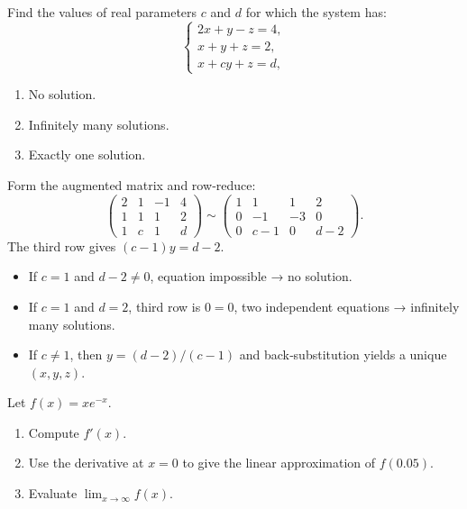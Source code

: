 \documentclass[11pt]{exam}
\begin{document}
\begin{questions}

\question[3]
Find the values of real parameters \(c\) and \(d\) for which the system has:
\[\begin{cases}
2x + y - z = 4,\\
x + y + z = 2,\\
x + cy + z = d,
\end{cases}\]
\begin{enumerate}[label=(\alph*)]
  \item No solution.
  \item Infinitely many solutions.
  \item Exactly one solution.
\end{enumerate}

\begin{solution}
Form the augmented matrix and row‑reduce:
\[
\left(\begin{array}{ccc|c}
2 & 1 & -1 & 4\\
1 & 1 &  1 & 2\\
1 & c &  1 & d
\end{array}\right)
\sim
\left(\begin{array}{ccc|c}
1 & 1 &  1 & 2\\
0 & -1& -3 & 0\\
0 & c-1 & 0 & d-2
\end{array}\right).
\]
The third row gives \((c-1)y = d-2\).
\begin{itemize}[nosep]
  \item If \(c=1\) and \(d-2\neq0\), equation impossible → no solution.
  \item If \(c=1\) and \(d=2\), third row is \(0=0\), two independent equations → infinitely many solutions.
  \item If \(c\neq1\), then \(y=(d-2)/(c-1)\) and back‑substitution yields a unique \((x,y,z)\).
\end{itemize}
\end{solution}

\question[2]
Let \(f(x)=x e^{-x}\).
\begin{enumerate}[label=(\alph*)]
  \item Compute \(f'(x)\).
  \item Use the derivative at \(x=0\) to give the linear approximation of \(f(0.05)\).
  \item Evaluate \(\lim_{x\to\infty}f(x)\).
\end{enumerate}


\end{questions}
\end{document}
